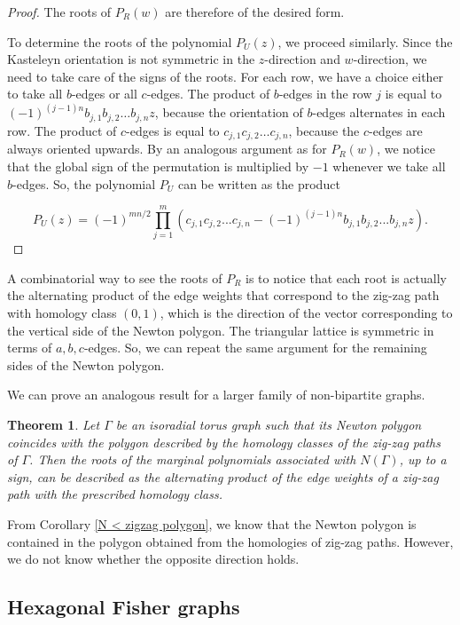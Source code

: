 \documentclass[12pt,a4paper]{article}
\newtheorem{thm}{Theorem}
\theoremstyle{definition}
\begin{document}
\begin{proof}
    The roots of $P_R(w)$ are therefore of the desired form.

    To determine the roots of the polynomial $P_U(z)$, we proceed similarly. Since the Kasteleyn orientation is not symmetric in the $z$-direction and $w$-direction, we need to take care of the signs of the roots. For each row, we have a choice either to take all $b$-edges or all $c$-edges. The product of $b$-edges in the row $j$ is equal to $(-1)^{(j-1)n}b_{j,1}b_{j,2} \dots b_{j,n}z$, because the orientation of $b$-edges alternates in each row. The product of $c$-edges is equal to $c_{j,1}c_{j,2} \dots c_{j,n}$, because the $c$-edges are always oriented upwards. By an analogous argument as for $P_R(w)$, we notice that the global sign of the permutation is multiplied by $-1$ whenever we take all $b$-edges. So, the polynomial $P_U$ can be written as the product

    \[P_U(z) = (-1)^{mn/2} \prod_{j = 1}^m(c_{j,1}c_{j,2}...c_{j,n} - (-1)^{(j-1)n}b_{j,1}b_{j,2}...b_{j,n}z).\]
\end{proof}

A combinatorial way to see the roots of $P_R$ is to notice that each root is actually the alternating product of the edge weights that correspond to the zig-zag path with homology class $(0,1)$, which is the direction of the vector corresponding to the vertical side of the Newton polygon. The triangular lattice is symmetric in terms of $a, b, c$-edges. So, we can repeat the same argument for the remaining sides of the Newton polygon. 

We can prove an analogous result for a larger family of non-bipartite graphs.

\begin{thm}
    Let $\Gamma$ be an isoradial torus graph such that its Newton polygon coincides with the polygon described by the homology classes of the zig-zag paths of $\Gamma$. Then the roots of the marginal polynomials associated with $N(\Gamma)$, up to a sign, can be described as the alternating product of the edge weights of a zig-zag path with the prescribed homology class.
\end{thm}

From Corollary \ref{N < zigzag polygon}, we know that the Newton polygon is contained in the polygon obtained from the homologies of zig-zag paths. However, we do not know whether the opposite direction holds.

\subsection{Hexagonal Fisher graphs}
\end{document}
